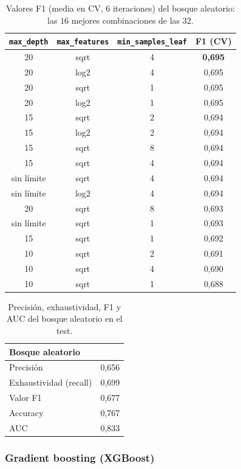 \documentclass[12pt,a4paper]{report}
\theoremstyle{definition}
\newcommand{\tc}[1]{\texttt{#1}}
\begin{document}
\begin{table}[H]
\centering\footnotesize
\begin{tabular}{cccc}
\toprule
\tc{max\_depth} & \tc{max\_features} & \tc{min\_samples\_leaf} & F1 (CV) \\
\midrule
20 & sqrt & 4 & \textbf{0,695} \\
20 & log2 & 4 & 0,695 \\
20 & sqrt & 1 & 0,695 \\
20 & log2 & 1 & 0,695 \\
15 & sqrt & 2 & 0,694 \\
15 & log2 & 2 & 0,694 \\
15 & sqrt & 8 & 0,694 \\
15 & sqrt & 4 & 0,694 \\
sin límite & sqrt & 4 & 0,694 \\
sin límite & log2 & 4 & 0,694 \\
20 & sqrt & 8 & 0,693 \\
sin límite & sqrt & 1 & 0,693 \\
15 & sqrt & 1 & 0,692 \\
10 & sqrt & 2 & 0,691 \\
10 & sqrt & 4 & 0,690 \\
10 & sqrt & 1 & 0,688 \\
\bottomrule
\end{tabular}
\caption{Valores F1 (media en CV, 6 iteraciones) del bosque aleatorio: las $16$ mejores
combinaciones de las $32$.}
\label{tab:grid-rf}
\end{table}

\begin{table}[H]
\centering\small
\begin{tabular}{lc}
\toprule
Bosque aleatorio & \\
\midrule
Precisión & 0,656 \\
Exhaustividad (recall) & 0,699 \\
Valor F1 & 0,677 \\
Accuracy & 0,767 \\
AUC & 0,833 \\
\bottomrule
\end{tabular}
\caption{Precisión, exhaustividad, F1 y AUC del bosque aleatorio en el test.}
\label{tab:met-rf}
\end{table}


\subsubsection{Gradient boosting (XGBoost)}
\end{document}
